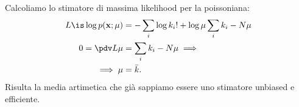 
\begin{example}
	Calcoliamo lo stimatore di massima likelihood per la poissoniana:
	\begin{align*}
		L \is \log p(\mathbf x;\mu)
		&= -\sum_i \log k_i! + \log\mu \sum_i k_i - N\mu \\
		0 = \pdv L\mu
		&= \sum_i k_i - N\mu \implies \\
		\implies \mu
		&= \bar k.
	\end{align*}
	Risulta la media artimetica che già sappiamo essere uno stimatore unbiased e efficiente.
\end{example}


